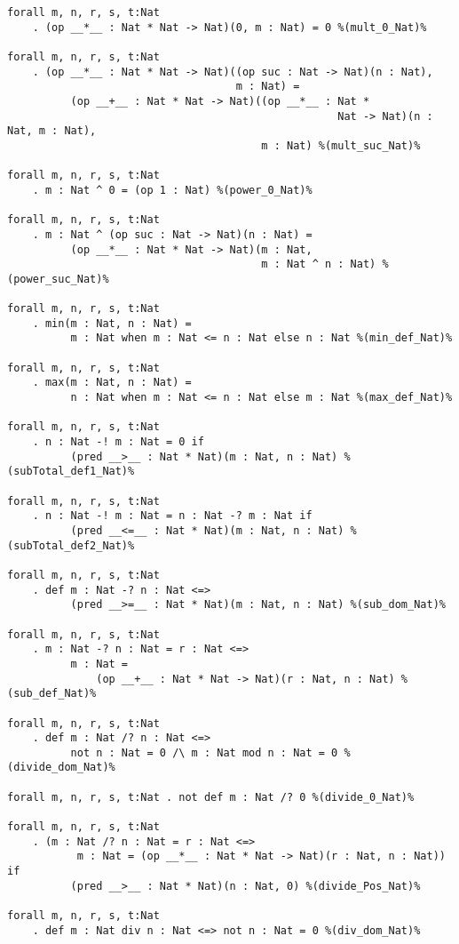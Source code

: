 \documentclass[11pt,a4paper]{article}
\begin{document}
\begin{verbatim}
forall m, n, r, s, t:Nat
    . (op __*__ : Nat * Nat -> Nat)(0, m : Nat) = 0 %(mult_0_Nat)%

forall m, n, r, s, t:Nat
    . (op __*__ : Nat * Nat -> Nat)((op suc : Nat -> Nat)(n : Nat),
                                    m : Nat) =
          (op __+__ : Nat * Nat -> Nat)((op __*__ : Nat *
                                                    Nat -> Nat)(n : Nat, m : Nat),
                                        m : Nat) %(mult_suc_Nat)%

forall m, n, r, s, t:Nat
    . m : Nat ^ 0 = (op 1 : Nat) %(power_0_Nat)%

forall m, n, r, s, t:Nat
    . m : Nat ^ (op suc : Nat -> Nat)(n : Nat) =
          (op __*__ : Nat * Nat -> Nat)(m : Nat,
                                        m : Nat ^ n : Nat) %(power_suc_Nat)%

forall m, n, r, s, t:Nat
    . min(m : Nat, n : Nat) =
          m : Nat when m : Nat <= n : Nat else n : Nat %(min_def_Nat)%

forall m, n, r, s, t:Nat
    . max(m : Nat, n : Nat) =
          n : Nat when m : Nat <= n : Nat else m : Nat %(max_def_Nat)%

forall m, n, r, s, t:Nat
    . n : Nat -! m : Nat = 0 if
          (pred __>__ : Nat * Nat)(m : Nat, n : Nat) %(subTotal_def1_Nat)%

forall m, n, r, s, t:Nat
    . n : Nat -! m : Nat = n : Nat -? m : Nat if
          (pred __<=__ : Nat * Nat)(m : Nat, n : Nat) %(subTotal_def2_Nat)%

forall m, n, r, s, t:Nat
    . def m : Nat -? n : Nat <=>
          (pred __>=__ : Nat * Nat)(m : Nat, n : Nat) %(sub_dom_Nat)%

forall m, n, r, s, t:Nat
    . m : Nat -? n : Nat = r : Nat <=>
          m : Nat =
              (op __+__ : Nat * Nat -> Nat)(r : Nat, n : Nat) %(sub_def_Nat)%

forall m, n, r, s, t:Nat
    . def m : Nat /? n : Nat <=>
          not n : Nat = 0 /\ m : Nat mod n : Nat = 0 %(divide_dom_Nat)%

forall m, n, r, s, t:Nat . not def m : Nat /? 0 %(divide_0_Nat)%

forall m, n, r, s, t:Nat
    . (m : Nat /? n : Nat = r : Nat <=>
           m : Nat = (op __*__ : Nat * Nat -> Nat)(r : Nat, n : Nat)) if
          (pred __>__ : Nat * Nat)(n : Nat, 0) %(divide_Pos_Nat)%

forall m, n, r, s, t:Nat
    . def m : Nat div n : Nat <=> not n : Nat = 0 %(div_dom_Nat)%


\end{verbatim}
\end{document}
